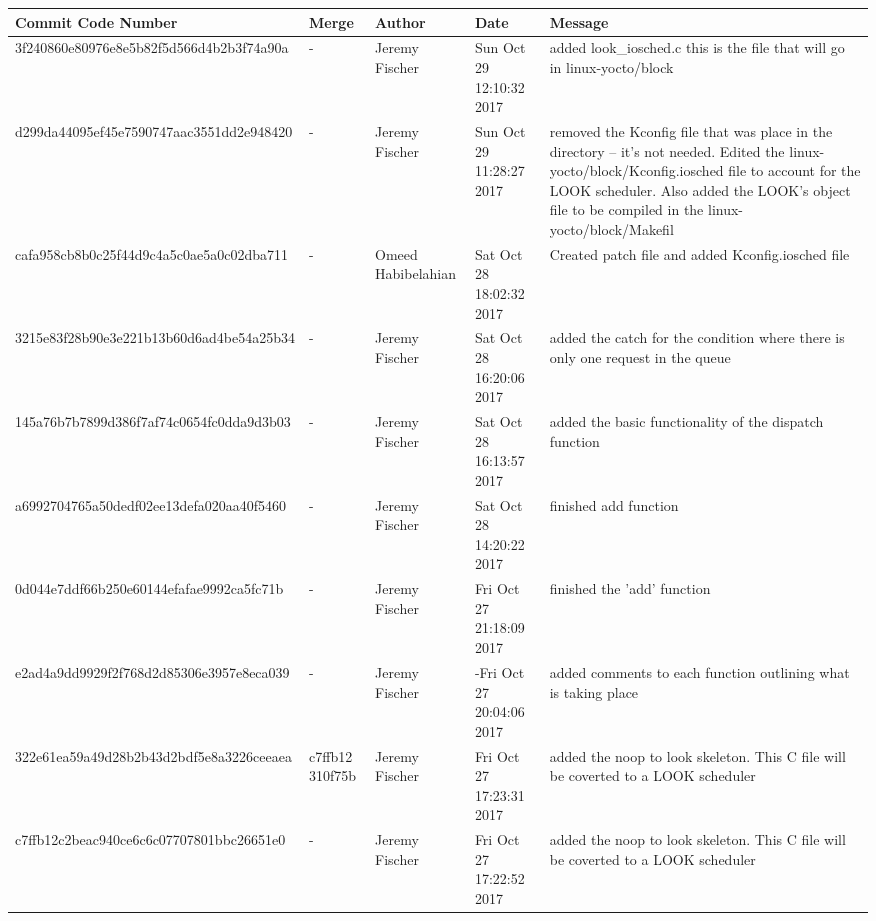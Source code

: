 \documentclass[draftclsnofoot, onecolumn, 10pt, compsoc]{IEEEtran}
\begin{document}
		\begin{tabular}{| p{6.8cm} | p{1.3cm} | p{2.5cm} | p{2cm} | p{4.2cm} |}
			\hline
			Commit Code Number & Merge & Author & Date & Message \\ \hline

			3f240860e80976e8e5b82f5d566d4b2b3f74a90a
			& -
			& Jeremy Fischer
			& Sun Oct 29 12:10:32 2017
			& added look\_iosched.c this is the file that will go in linux-yocto/block \\
			\hline

			d299da44095ef45e7590747aac3551dd2e948420
			& -
			& Jeremy Fischer
			& Sun Oct 29 11:28:27 2017
			& removed the Kconfig file that was place in the directory -- it's not needed. Edited the linux-yocto/block/Kconfig.iosched file to account for the LOOK scheduler. Also added the LOOK's object file to be compiled in the linux-yocto/block/Makefil \\
			\hline

			cafa958cb8b0c25f44d9c4a5c0ae5a0c02dba711
			& -
			& Omeed Habibelahian
			& Sat Oct 28 18:02:32 2017
			& Created patch file and added Kconfig.iosched file \\
			\hline

			3215e83f28b90e3e221b13b60d6ad4be54a25b34
			& -
			& Jeremy Fischer
			& Sat Oct 28 16:20:06 2017
			& added the catch for the condition where there is only one request in the queue \\
			\hline

			145a76b7b7899d386f7af74c0654fc0dda9d3b03
			& -
			& Jeremy Fischer
			& Sat Oct 28 16:13:57 2017
			& added the basic functionality of the dispatch function \\
			\hline

			a6992704765a50dedf02ee13defa020aa40f5460
			& -
			& Jeremy Fischer
			& Sat Oct 28 14:20:22 2017
			& finished add function \\
			\hline

			0d044e7ddf66b250e60144efafae9992ca5fc71b
			& -
			& Jeremy Fischer
			& Fri Oct 27 21:18:09 2017
    			& finished the 'add' function \\
			\hline

			e2ad4a9dd9929f2f768d2d85306e3957e8eca039
			& -
			& Jeremy Fischer
			& -Fri Oct 27 20:04:06 2017
			& added comments to each function outlining what is taking place \\
			\hline

			322e61ea59a49d28b2b43d2bdf5e8a3226ceeaea
			& c7ffb12 310f75b
			& Jeremy Fischer
			& Fri Oct 27 17:23:31 2017
			& added the noop to look skeleton. This C file will be coverted to a LOOK scheduler \\
			\hline

			c7ffb12c2beac940ce6c6c07707801bbc26651e0
			& -
			& Jeremy Fischer
			& Fri Oct 27 17:22:52 2017
			& added the noop to look skeleton. This C file will be coverted to a LOOK scheduler \\
			\hline
		\end{tabular}
\end{document}
